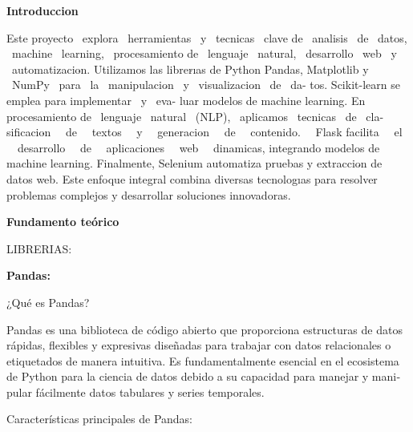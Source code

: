 \documentclass[letterpaper]{article}
\begin{document}
\bigskip


\bigskip


\bigskip


\bigskip


\bigskip


\bigskip


\bigskip


\bigskip


\bigskip

{
\textbf{Introduccio$\acute{}$n}}

{
Este proyecto \ explora \ herramientas \ y \ te$\acute{}$cnicas \ clave de \ ana$\acute{}$lisis \ de \ datos, \ machine
\ learning, \ procesamiento de \ lenguaje \ natural, \ desarrollo \ web \ y \ automatizacio$\acute{}$n. Utilizamos las
librer$\acute{}$ıas de Python Pandas, Matplotlib y \ NumPy \ para \ la \ manipulacio$\acute{}$n \ y
\ visualizacio$\acute{}$n \ de \ da- tos. Scikit-learn se emplea para implementar \ y \ eva- luar modelos de machine
learning. En procesamiento de \ lenguaje \ natural \ (NLP), \ aplicamos \ te$\acute{}$cnicas \ de \ cla-
sificacio$\acute{}$n \ \ de \ \ textos \ \ y \ \ generacio$\acute{}$n \ \ de \ \ contenido. \ \ Flask facilita \ \ el
\ \ desarrollo \ \ de \ \ aplicaciones \ \ web \ \ dina$\acute{}$micas, integrando modelos de machine learning.
Finalmente, Selenium automatiza pruebas y extraccio$\acute{}$n de datos web. Este enfoque integral combina diversas
tecnolog$\acute{}$ıas para resolver problemas complejos y desarrollar soluciones innovadoras.}

\clearpage
\pagestyle{Convertediii}
{
\foreignlanguage{spanish}{\textbf{Fundamento teórico}}}

{
\foreignlanguage{spanish}{LIBRERIAS:}}

{
\foreignlanguage{spanish}{\textbf{Pandas:}}}

{
\foreignlanguage{spanish}{¿Qué es Pandas?}}

{
\foreignlanguage{spanish}{Pandas es una biblioteca de código abierto que proporciona estructuras de datos rápidas,
flexibles y expresivas diseñadas para trabajar con datos relacionales o etiquetados de manera intuitiva. Es
fundamentalmente esencial en el ecosistema de Python para la ciencia de datos debido a su capacidad para manejar y
manipular fácilmente datos tabulares y series temporales.}}

{
\foreignlanguage{spanish}{Características principales de Pandas:}}
\end{document}
